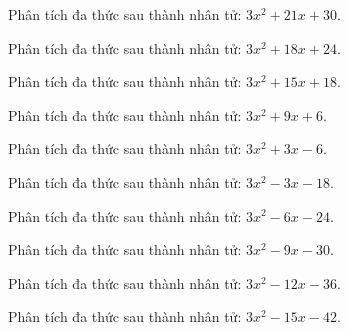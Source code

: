 \begin{bt}
	Phân tích đa thức sau thành nhân tử: $3 x^2 + 21 x + 30$.
\end{bt}
\begin{bt}
	Phân tích đa thức sau thành nhân tử: $3 x^2 + 18 x + 24$.
\end{bt}
\begin{bt}
	Phân tích đa thức sau thành nhân tử: $3 x^2 + 15 x + 18$.
\end{bt}
\begin{bt}
	Phân tích đa thức sau thành nhân tử: $3 x^2 + 9 x + 6$.
\end{bt}
\begin{bt}
	Phân tích đa thức sau thành nhân tử: $3 x^2 + 3 x - 6$.
\end{bt}
\begin{bt}
	Phân tích đa thức sau thành nhân tử: $3 x^2 - 3 x - 18$.
\end{bt}
\begin{bt}
	Phân tích đa thức sau thành nhân tử: $3 x^2 - 6 x - 24$.
\end{bt}
\begin{bt}
	Phân tích đa thức sau thành nhân tử: $3 x^2 - 9 x - 30$.
\end{bt}
\begin{bt}
	Phân tích đa thức sau thành nhân tử: $3 x^2 - 12 x - 36$.
\end{bt}
\begin{bt}
	Phân tích đa thức sau thành nhân tử: $3 x^2 - 15 x - 42$.
\end{bt}
